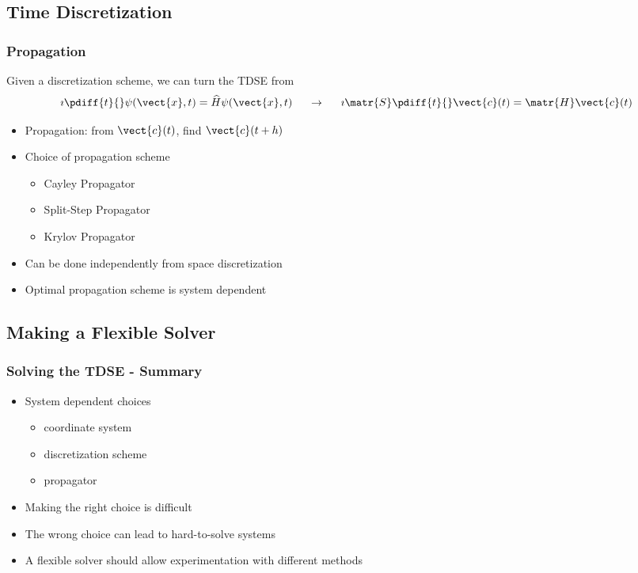 \documentclass{beamer}
\begin{document}
\subsection{Time Discretization}

\begin{frame}
	\frametitle{Propagation}

	Given a discretization scheme, we can turn the TDSE from 
	\begin{equation*}
		\imath \pdiff{t}{}\psi(\vect{x},t) = \widehat{H} \psi(\vect{x},t) 
		\hspace{0.5cm}\rightarrow\hspace{0.5cm}
		\imath \matr{S} \pdiff{t}{}\vect{c}(t) = \matr{H} \vect{c}(t)
	\end{equation*}

	\begin{itemize}
		\item<2-> Propagation: from $\vect{c}(t)$, find $\vect{c}(t+h)$
		\item<3-> Choice of propagation scheme
			\begin{itemize}
				\item Cayley Propagator
				\item Split-Step Propagator
				\item Krylov Propagator
			\end{itemize}
		\item<4-> Can be done independently from space discretization
		\item<5-> Optimal propagation scheme is system dependent
	\end{itemize}
	
\end{frame}


\subsection{Making a Flexible Solver}

\begin{frame}
	\frametitle{Solving the TDSE - Summary}

	\begin{itemize}
		\item System dependent choices
			\begin{itemize}
				\item coordinate system
				\item discretization scheme
				\item propagator
			\end{itemize}
		\item<2-> Making the right choice is difficult
		\item<3-> The wrong choice can lead to hard-to-solve systems
		\item<4-> A flexible solver should allow experimentation with different methods
	\end{itemize}

\end{frame}
\end{document}
